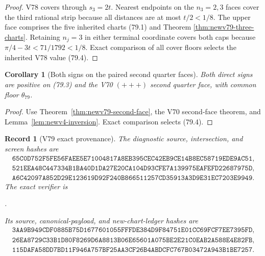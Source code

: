 \documentclass[11pt,oneside]{article}
\newtheorem{corollary}[theorem]{Corollary}
\newtheorem{record}[theorem]{Record}
\theoremstyle{definition}
\theoremstyle{remark}
\begin{document}
\begin{proof}
V78 covers through \(s_3=2t\).  Nearest endpoints on the
\(n_3=2,3\) faces cover the third rational strip because all
distances are at most \(t/2<1/8\).  The upper face comprises the
five inherited charts (79.1) and Theorem
\ref{thm:newv79-three-charts}.  Retaining \(n_j=3\) in either
terminal coordinate covers both caps because
\(\pi/4-3t<71/1792<1/8\).  Exact comparison of all cover floors
selects the inherited V78 value (79.4).
\end{proof}

\begin{corollary}[Both signs on the paired second quarter faces]
\label{cor:newv79-paired-faces}
Both direct signs are positive on (79.3) and the V70
\((+++)\) second quarter face, with common floor \(\theta_{79}\).
\end{corollary}

\begin{proof}
Use Theorem~\ref{thm:newv79-second-face}, the V70 second-face
theorem, and Lemma~\ref{lem:newv4-inversion}.  Exact comparison
selects (79.4).
\end{proof}

\begin{record}[V79 exact provenance]
\label{rec:newv79-provenance}
The diagnostic source, intersection, and screen hashes are
\[
\begin{gathered}
\texttt{65C0D752F5FE56FAEE5E71004817A8EB395CEC42EB9CE14B8EC58719EDE9AC51},\\
\texttt{521EEA48C447334B1BA40D1DA27E20CA104D93CFE7A139975EAFEFD22687975D},\\
\texttt{A6C42097A852D29E123619D92F240B866511257CD35913A3D9E31EC7203E9949}.
\end{gathered}                                          \tag{79.5}
\]
The exact verifier is
\begin{center}\footnotesize
{}.
\end{center}
Its source, canonical-payload, and new-chart-ledger hashes are
\[
\begin{gathered}
\texttt{3AA9B949CDF0885B75D1677601055FFFDE384D9F84751E01CC69FCF7EE7395FD},\\
\texttt{26EA8729C33B1D80F8269D6A8813B06E65601A075BE2E21C0EAB2A588E4E82FB},\\
\texttt{115DAFA58DD7BD11F946A757BF25AA3CF26B4ABDCFC767B03472A943B1BE7257}.
\end{gathered}                                          \tag{79.6}
\]
\end{record}
\end{document}

